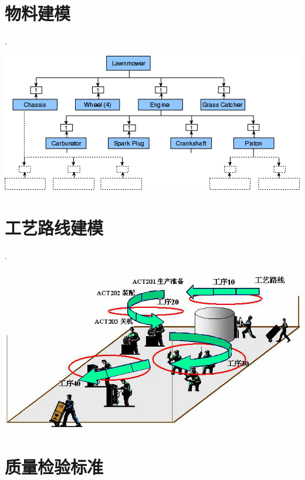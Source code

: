 \clearbeforecontfalse

\ifdefined\makeCont{\begincont}\fi

\section {物料建模}
        .
        \begin{center}
            \includegraphics[scale=0.6] {bom1.png}
        \end{center}


\section {工艺路线建模}
        .
        \begin{center}
            \includegraphics[scale=0.5] {flow1.png}
        \end{center}

\section {质量检验标准}

    

\ifdefined\makeCont{\endcont}\fi

